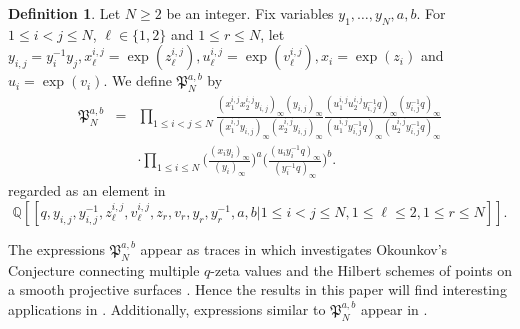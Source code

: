 \documentclass[12pt, reqno]{amsart}
\theoremstyle{definition}
\newtheorem{definition}[theorem]{Definition}
\theoremstyle{remark}
\numberwithin{equation}{section}
\newcommand{\Q}{ \mathbb Q }
\numberwithin{equation}{section}
\begin{document}
\begin{definition}   \label{def-zmvn}
Let $N \ge 2$ be an integer. Fix variables $y_1, \ldots, y_N, a, b$. 
For $1 \le i < j \le N$, $\ell \in \{1, 2\}$ and $1 \le r \le N$, let 
$y_{i,j} = y_i^{-1}y_j, x_\ell^{i,j} = \exp(z_\ell^{i,j}), 
u_\ell^{i,j} = \exp(v_\ell^{i,j}), x_i = \exp(z_i)$ and $u_i = \exp(v_i)$.
We define $\mathfrak P_{N}^{a,b}$ by 
\begin{eqnarray*}     
   \mathfrak P_{N}^{a,b}
&=&\prod_{1 \le i < j \le N} 
   \frac{(x_1^{i,j}x_2^{i,j}y_{i,j})_\infty (y_{i,j})_\infty}
     {(x_1^{i,j}y_{i,j})_\infty (x_2^{i,j}y_{i,j})_\infty} 
   \frac{(u_1^{i,j}u_2^{i,j}y_{i,j}^{-1}q)_\infty (y_{i,j}^{-1}q)_\infty}
     {(u_1^{i,j}y_{i,j}^{-1}q)_\infty (u_2^{i,j}y_{i,j}^{-1}q)_\infty} \\
& &\cdot \prod_{1 \le i \le N} 
   \bigg (\frac{(x_iy_i)_\infty}{(y_i)_\infty} \bigg )^a
   \bigg (\frac{(u_iy_i^{-1}q)_\infty}{(y_i^{-1}q)_\infty} \bigg )^b.
\end{eqnarray*}
regarded as an element in 
$$
\Q[[q, y_{i,j}, y_{i,j}^{-1}, z_\ell^{i,j}, v_\ell^{i,j}, z_r, v_r,
y_r, y_r^{-1}, a, b|1 \le i < j \le N, 1 \le \ell \le 2, 1 \le r \le N]].
$$
\end{definition}

The expressions $\mathfrak P_{N}^{a,b}$ appear as traces in \cite{AQ2} 
which investigates Okounkov's Conjecture \cite{Oko} connecting 
multiple $q$-zeta values and the Hilbert schemes of points on 
a smooth projective surfaces 
\cite{Alh, AQ1, Car1, Car2, CO, Qin1, Qin2, QY, Zhou}. 
Hence the results in this paper will find interesting applications 
in \cite{AQ2}. Additionally, expressions similar to 
$\mathfrak P_{N}^{a,b}$ appear in \cite[Theorem~16]{CW}. 
\end{document}
